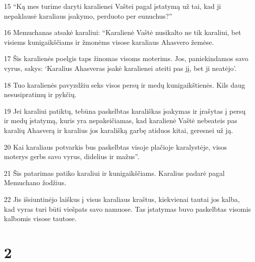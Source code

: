 \par 15 “Ką mes turime daryti karalienei Vaštei pagal įstatymą už tai, kad ji nepaklausė karaliaus įsakymo, perduoto per eunuchus?” 
\par 16 Memuchanas atsakė karaliui: “Karalienė Vaštė nusikalto ne tik karaliui, bet visiems kunigaikščiams ir žmonėms visose karaliaus Ahasvero žemėse. 
\par 17 Šis karalienės poelgis taps žinomas visoms moterims. Jos, paniekindamos savo vyrus, sakys: ‘Karalius Ahasveras įsakė karalienei ateiti pas jį, bet ji neatėjo’. 
\par 18 Tuo karalienės pavyzdžiu seks visos persų ir medų kunigaikštienės. Kils daug nesusipratimų ir pykčių. 
\par 19 Jei karaliui patiktų, tebūna paskelbtas karališkas įsakymas ir įrašytas į persų ir medų įstatymą, kuris yra nepakeičiamas, kad karalienė Vaštė nebeateis pas karalių Ahasverą ir karalius jos karališką garbę atiduos kitai, geresnei už ją. 
\par 20 Kai karaliaus potvarkis bus paskelbtas visoje plačioje karalystėje, visos moterys gerbs savo vyrus, didelius ir mažus”. 
\par 21 Šis patarimas patiko karaliui ir kunigaikščiams. Karalius padarė pagal Memuchano žodžius. 
\par 22 Jis išsiuntinėjo laiškus į visus karaliaus kraštus, kiekvienai tautai jos kalba, kad vyras turi būti viešpats savo namuose. Tas įstatymas buvo paskelbtas visomis kalbomis visose tautose.


\chapter{2}

